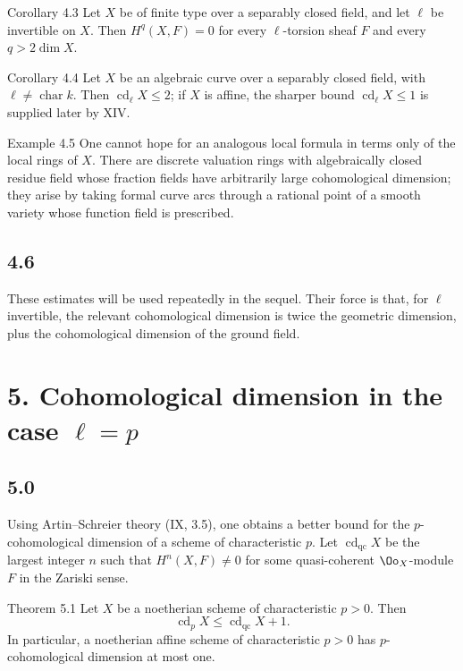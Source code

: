 \begin{statement}{Corollary 4.3}
Let \(X\) be of finite type over a separably closed field, and let \(\ell\) be invertible on \(X\). Then \(H^q(X,F)=0\) for every \(\ell\)-torsion sheaf \(F\) and every \(q>2\dim X\).
\end{statement}

\begin{statement}{Corollary 4.4}
Let \(X\) be an algebraic curve over a separably closed field, with \(\ell\ne\operatorname{char}k\). Then \(\operatorname{cd}_\ell X\leq2\); if \(X\) is affine, the sharper bound \(\operatorname{cd}_\ell X\leq1\) is supplied later by XIV.
\end{statement}

\begin{remarktext}{Example 4.5}
One cannot hope for an analogous local formula in terms only of the local rings of \(X\). There are discrete valuation rings with algebraically closed residue field whose fraction fields have arbitrarily large cohomological dimension; they arise by taking formal curve arcs through a rational point of a smooth variety whose function field is prescribed.
\end{remarktext}

\subsection*{4.6}
These estimates will be used repeatedly in the sequel. Their force is that, for \(\ell\) invertible, the relevant cohomological dimension is twice the geometric dimension, plus the cohomological dimension of the ground field.

\section*{5. Cohomological dimension in the case \(\ell=p\)}

\subsection*{5.0}
Using Artin--Schreier theory (IX, 3.5), one obtains a better bound for the \(p\)-cohomological dimension of a scheme of characteristic \(p\). Let \(\operatorname{cd}_{\mathrm{qc}}X\) be the largest integer \(n\) such that \(H^n(X,F)\ne0\) for some quasi-coherent \(\Oo_X\)-module \(F\) in the Zariski sense.

\begin{statement}{Theorem 5.1}
Let \(X\) be a noetherian scheme of characteristic \(p>0\). Then
\[
\operatorname{cd}_pX\leq \operatorname{cd}_{\mathrm{qc}}X+1.
\]
In particular, a noetherian affine scheme of characteristic \(p>0\) has \(p\)-cohomological dimension at most one.
\end{statement}

